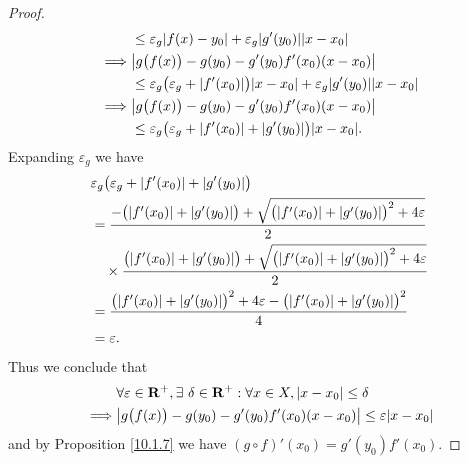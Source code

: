 \begin{proof}
\begin{align*}
                 & \leq \varepsilon_g \abs*{f(x) - y_0} + \varepsilon_g \abs*{g'(y_0)} \abs*{x - x_0}                                       \\
        \implies & \abs*{g\big(f(x)\big) - g(y_0) - g'(y_0) f'(x_0) (x - x_0)}                                                              \\
                 & \leq \varepsilon_g \big(\varepsilon_g + \abs*{f'(x_0)}\big) \abs*{x - x_0} + \varepsilon_g \abs*{g'(y_0)} \abs*{x - x_0} \\
        \implies & \abs*{g\big(f(x)\big) - g(y_0) - g'(y_0) f'(x_0) (x - x_0)}                                                              \\
                 & \leq \varepsilon_g \big(\varepsilon_g + \abs*{f'(x_0)} + \abs*{g'(y_0)}\big) \abs*{x - x_0}.
    \end{align*}
    Expanding \(\varepsilon_g\) we have
    \begin{align*}
         & \varepsilon_g \big(\varepsilon_g + \abs*{f'(x_0)} + \abs*{g'(y_0)}\big)                                                               \\
         & = \frac{-\big(\abs*{f'(x_0)} + \abs*{g'(y_0)}\big) + \sqrt{\big(\abs*{f'(x_0)} + \abs*{g'(y_0)}\big)^2 + 4 \varepsilon}}{2}           \\
         & \quad \times \frac{\big(\abs*{f'(x_0)} + \abs*{g'(y_0)}\big) + \sqrt{\big(\abs*{f'(x_0)} + \abs*{g'(y_0)}\big)^2 + 4 \varepsilon}}{2} \\
         & = \frac{\big(\abs*{f'(x_0)} + \abs*{g'(y_0)}\big)^2 + 4 \varepsilon - \big(\abs*{f'(x_0)} + \abs*{g'(y_0)}\big)^2}{4}                 \\
         & = \varepsilon.
    \end{align*}
    Thus we conclude that
    \begin{align*}
                 & \forall \varepsilon \in \mathbf{R}^+, \exists\ \delta \in \mathbf{R}^+ : \forall x \in X, \abs*{x - x_0} \leq \delta \\
        \implies & \abs*{g\big(f(x)\big) - g(y_0) - g'(y_0) f'(x_0) (x - x_0)} \leq \varepsilon \abs*{x - x_0}
    \end{align*}
    and by Proposition \ref{10.1.7} we have \((g \circ f)'(x_0) = g'(y_0) f'(x_0)\).
\end{proof}

